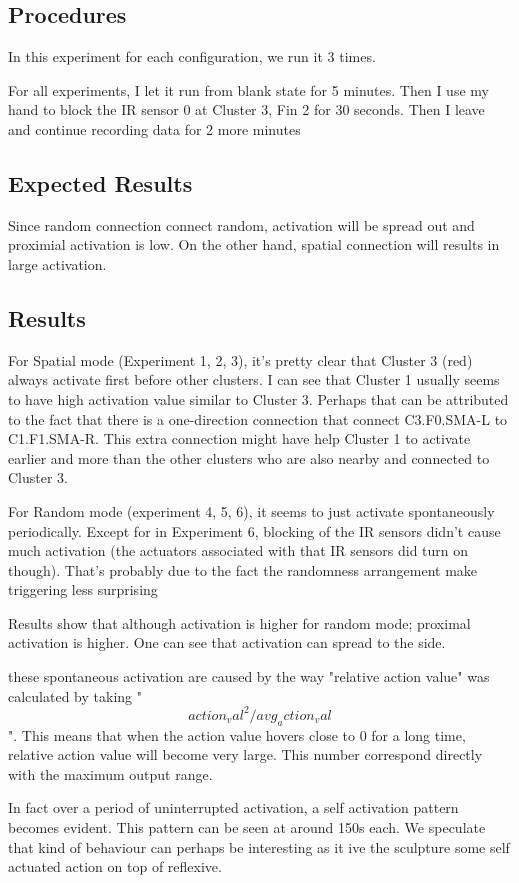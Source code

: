 \subsection{Procedures}
In this experiment for each configuration, we run it 3 times. 

For all experiments, I let it run from blank state for 5 minutes. Then I use my hand to block the IR sensor 0 at Cluster 3, Fin 2 for 30 seconds. Then I leave and continue recording data for 2 more minutes


\subsection{Expected Results}
Since random connection connect random, activation will be spread out and proximial activation is low. On the other hand, spatial connection will results in large activation. 

\subsection{Results}
For Spatial mode (Experiment 1, 2, 3), it's pretty clear that Cluster 3 (red) always activate first before other clusters. I can see that Cluster 1 usually seems to have high activation value similar to Cluster 3. Perhaps that can be attributed to the fact that there is a one-direction connection that connect C3.F0.SMA-L to C1.F1.SMA-R. This extra connection might have help Cluster 1 to activate earlier and more than the other clusters who are also nearby and connected to Cluster 3.


For Random mode (experiment 4, 5, 6), it seems to just activate spontaneously periodically. Except for in Experiment 6, blocking of the IR sensors didn't cause much activation (the actuators associated with that IR sensors did turn on though). That's probably due to the fact the randomness arrangement make triggering less surprising 

Results show that although activation is higher for random mode; proximal activation is higher. One can see that activation can spread to the side. 

these spontaneous activation are caused by the way "relative action value" was calculated by taking "\[action_val^2/avg_action_val\]". This means that when the action value hovers close to 0 for a long time, relative action value will become very large. This number correspond directly with the maximum output range. 

In fact over a period of uninterrupted activation, a self activation pattern becomes evident. This pattern can be seen at around 150s each. We speculate that kind of behaviour can perhaps be interesting as it ive the sculpture some self actuated action on top of reflexive.  



